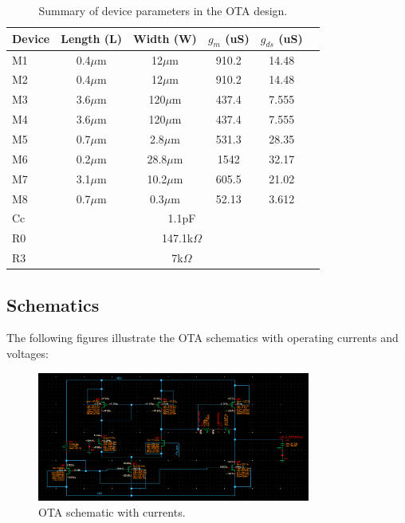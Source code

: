 \documentclass[12pt,a4paper]{article}
\begin{document}
\begin{table}[H]
    \centering
    \begin{tabular}{@{}lccccc@{}}
    \toprule
    \textbf{Device} & \textbf{Length (L)} & \textbf{Width (W)} & \textbf{$g_m$ (uS)} & \textbf{$g_{ds}$ (uS)} \\
    \midrule
    M1 & 0.4$\mu$m & 12$\mu$m & 910.2 & 14.48 \\
    M2 & 0.4$\mu$m & 12$\mu$m & 910.2 & 14.48 \\
    M3 & 3.6$\mu$m & 120$\mu$m & 437.4 & 7.555 \\
    M4 & 3.6$\mu$m & 120$\mu$m & 437.4 & 7.555 \\
    M5 & 0.7$\mu$m & 2.8$\mu$m & 531.3 & 28.35 \\
    M6 & 0.2$\mu$m & 28.8$\mu$m & 1542 & 32.17 \\
    M7 & 3.1$\mu$m & 10.2$\mu$m & 605.5 & 21.02 \\
    M8 & 0.7$\mu$m & 0.3$\mu$m & 52.13 & 3.612 \\
    \midrule
    Cc & \multicolumn{4}{c}{1.1pF} \\
    R0 & \multicolumn{4}{c}{147.1k$\Omega$} \\
    R3 & \multicolumn{4}{c}{7k$\Omega$} \\
    \bottomrule
    \end{tabular}
    \caption{Summary of device parameters in the OTA design.}
    \label{tab:parameters}
\end{table}
\pagebreak
\subsection*{Schematics}
The following figures illustrate the OTA schematics with operating currents and voltages:

\begin{figure}[H]
    \centering
    \includegraphics[width=0.8\textwidth]{scematic_OTA.png}
    \caption{OTA schematic with currents.}
    \label{fig:ota_currents}
\end{figure}
\end{document}
